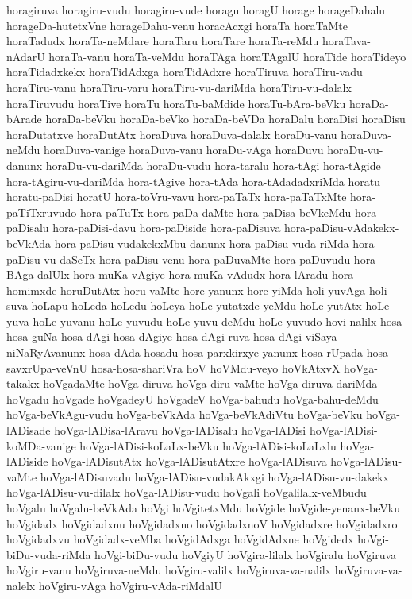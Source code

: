{horagiruva
horagiru-vudu
horagiru-vude
horagu
horagU
horage
horageDahalu
horageDa-hutetxVne
horageDahu-venu
horacAcxgi
horaTa
horaTaMte
horaTadudx
horaTa-neMdare
horaTaru
horaTare
horaTa-reMdu
horaTava-nAdarU
horaTa-vanu
horaTa-veMdu
horaTAga
horaTAgalU
horaTide
horaTideyo
horaTidadxkekx
horaTidAdxga
horaTidAdxre
horaTiruva
horaTiru-vadu
horaTiru-vanu
horaTiru-varu
horaTiru-vu-dariMda
horaTiru-vu-dalalx
horaTiruvudu
horaTive
horaTu
horaTu-baMdide
horaTu-bAra-beVku
horaDa-bArade
horaDa-beVku
horaDa-beVko
horaDa-beVDa
horaDalu
horaDisi
horaDisu
horaDutatxve
horaDutAtx
horaDuva
horaDuva-dalalx
horaDu-vanu
horaDuva-neMdu
horaDuva-vanige
horaDuva-vanu
horaDu-vAga
horaDuvu
horaDu-vu-danunx
horaDu-vu-dariMda
horaDu-vudu
hora-taralu
hora-tAgi
hora-tAgide
hora-tAgiru-vu-dariMda
hora-tAgive
hora-tAda
hora-tAdadadxriMda
horatu
horatu-paDisi
horatU
hora-toVru-vavu
hora-paTaTx
hora-paTaTxMte
hora-paTiTxruvudo
hora-paTuTx
hora-paDa-daMte
hora-paDisa-beVkeMdu
hora-paDisalu
hora-paDisi-davu
hora-paDiside
hora-paDisuva
hora-paDisu-vAdakekx-beVkAda
hora-paDisu-vudakekxMbu-danunx
hora-paDisu-vuda-riMda
hora-paDisu-vu-daSeTx
hora-paDisu-venu
hora-paDuvaMte
hora-paDuvudu
hora-BAga-dalUlx
hora-muKa-vAgiye
hora-muKa-vAdudx
hora-lAradu
hora-homimxde
horuDutAtx
horu-vaMte
hore-yanunx
hore-yiMda
holi-yuvAga
holi-suva
hoLapu
hoLeda
hoLedu
hoLeya
hoLe-yutatxde-yeMdu
hoLe-yutAtx
hoLe-yuva
hoLe-yuvanu
hoLe-yuvudu
hoLe-yuvu-deMdu
hoLe-yuvudo
hovi-nalilx
hosa
hosa-guNa
hosa-dAgi
hosa-dAgiye
hosa-dAgi-ruva
hosa-dAgi-viSaya-niNaRyAvanunx
hosa-dAda
hosadu
hosa-parxkirxye-yanunx
hosa-rUpada
hosa-savxrUpa-veVnU
hosa-hosa-shariVra
hoV
hoVMdu-veyo
hoVkAtxvX
hoVga-takakx
hoVgadaMte
hoVga-diruva
hoVga-diru-vaMte
hoVga-diruva-dariMda
hoVgadu
hoVgade
hoVgadeyU
hoVgadeV
hoVga-bahudu
hoVga-bahu-deMdu
hoVga-beVkAgu-vudu
hoVga-beVkAda
hoVga-beVkAdiVtu
hoVga-beVku
hoVga-lADisade
hoVga-lADisa-lAravu
hoVga-lADisalu
hoVga-lADisi
hoVga-lADisi-koMDa-vanige
hoVga-lADisi-koLaLx-beVku
hoVga-lADisi-koLaLxlu
hoVga-lADiside
hoVga-lADisutAtx
hoVga-lADisutAtxre
hoVga-lADisuva
hoVga-lADisu-vaMte
hoVga-lADisuvadu
hoVga-lADisu-vudakAkxgi
hoVga-lADisu-vu-dakekx
hoVga-lADisu-vu-dilalx
hoVga-lADisu-vudu
hoVgali
hoVgalilalx-veMbudu
hoVgalu
hoVgalu-beVkAda
hoVgi
hoVgitetxMdu
hoVgide
hoVgide-yenanx-beVku
hoVgidadx
hoVgidadxnu
hoVgidadxno
hoVgidadxnoV
hoVgidadxre
hoVgidadxro
hoVgidadxvu
hoVgidadx-veMba
hoVgidAdxga
hoVgidAdxne
hoVgidedx
hoVgi-biDu-vuda-riMda
hoVgi-biDu-vudu
hoVgiyU
hoVgira-lilalx
hoVgiralu
hoVgiruva
hoVgiru-vanu
hoVgiruva-neMdu
hoVgiru-valilx
hoVgiruva-va-nalilx
hoVgiruva-va-nalelx
hoVgiru-vAga
hoVgiru-vAda-riMdalU
}
